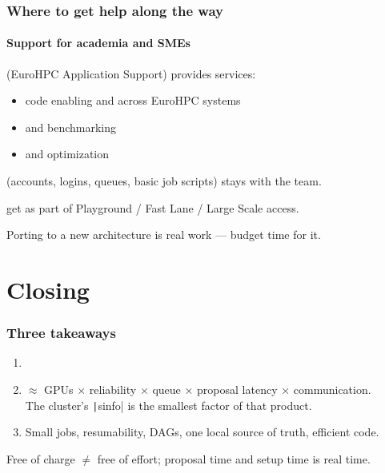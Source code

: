 \documentclass[10pt,aspectratio=169,notheorems]{beamer}
\begin{document}
\begin{frame}
    \frametitle{Where to get help along the way}
    \framesubtitle{Support for academia and SMEs}
     (EuroHPC Application Support) provides  services:
    \begin{itemize}
        \item code enabling and  across EuroHPC systems
        \item {} and benchmarking
        \item {} and optimization
    \end{itemize}

    \vspace{0.8em}
     (accounts, logins, queues, basic job scripts) stays with the  team.

    \vspace{0.8em}
     get  as part of Playground / Fast Lane / Large Scale access.

    \vspace{1.5em}
    \textcolor{SlidemintMuted}{Porting to a new architecture is real work --- budget time for it.}
\end{frame}

\section{Closing}

\begin{frame}[fragile]
    \frametitle{Three takeaways}
    \begin{enumerate}
        \item {}
        \item {} $\approx$ GPUs $\times$ reliability $\times$ queue $\times$ proposal latency $\times$ communication.\\
              The cluster's \texttt|sinfo| is the smallest factor of that product.
        \item {} Small jobs, resumability, DAGs, one local source of truth, efficient code.
    \end{enumerate}

    \vspace{2em}
    \textcolor{SlidemintMuted}{Free of charge $\neq$ free of effort; proposal time and setup time is real time.}
\end{frame}
\end{document}
